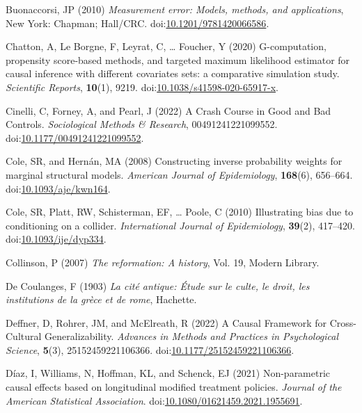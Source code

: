 \documentclass[
  singlecolumn]{article}
\newlength{\cslhangindent}
\newlength{\cslentryspacingunit} %
\newenvironment{CSLReferences}[2] %
 {%
  \setlength{\parindent}{0pt}
  \ifodd #1
  \let\oldpar\par
  \def\par{\hangindent=\cslhangindent\oldpar}
  \fi
  \setlength{\parskip}{#2\cslentryspacingunit}
 }%
 {}
\begin{document}
\begin{CSLReferences}{1}{0}
\leavevmode{}%
Buonaccorsi, JP (2010) \emph{Measurement error: Models, methods, and
applications}, New York: Chapman; Hall/CRC.
doi:\href{https://doi.org/10.1201/9781420066586}{10.1201/9781420066586}.

\leavevmode{}%
Chatton, A, Le Borgne, F, Leyrat, C, \ldots{} Foucher, Y (2020)
G-computation, propensity score-based methods, and targeted maximum
likelihood estimator for causal inference with different covariates
sets: a comparative simulation study. \emph{Scientific Reports},
\textbf{10}(1), 9219.
doi:\href{https://doi.org/10.1038/s41598-020-65917-x}{10.1038/s41598-020-65917-x}.

\leavevmode{}%
Cinelli, C, Forney, A, and Pearl, J (2022) A Crash Course in Good and
Bad Controls. \emph{Sociological Methods \& Research},
00491241221099552.
doi:\href{https://doi.org/10.1177/00491241221099552}{10.1177/00491241221099552}.

\leavevmode{}%
Cole, SR, and Hernán, MA (2008) Constructing inverse probability weights
for marginal structural models. \emph{American Journal of Epidemiology},
\textbf{168}(6), 656--664.
doi:\href{https://doi.org/10.1093/aje/kwn164}{10.1093/aje/kwn164}.

\leavevmode{}%
Cole, SR, Platt, RW, Schisterman, EF, \ldots{} Poole, C (2010)
Illustrating bias due to conditioning on a collider. \emph{International
Journal of Epidemiology}, \textbf{39}(2), 417--420.
doi:\href{https://doi.org/10.1093/ije/dyp334}{10.1093/ije/dyp334}.

\leavevmode{}%
Collinson, P (2007) \emph{The reformation: A history}, Vol. 19, Modern
Library.

\leavevmode{}%
De Coulanges, F (1903) \emph{La cité antique: Étude sur le culte, le
droit, les institutions de la grèce et de rome}, Hachette.

\leavevmode{}%
Deffner, D, Rohrer, JM, and McElreath, R (2022) A Causal Framework for
Cross-Cultural Generalizability. \emph{Advances in Methods and Practices
in Psychological Science}, \textbf{5}(3), 25152459221106366.
doi:\href{https://doi.org/10.1177/25152459221106366}{10.1177/25152459221106366}.

\leavevmode{}%
Díaz, I, Williams, N, Hoffman, KL, and Schenck, EJ (2021) Non-parametric
causal effects based on longitudinal modified treatment policies.
\emph{Journal of the American Statistical Association}.
doi:\href{https://doi.org/10.1080/01621459.2021.1955691}{10.1080/01621459.2021.1955691}.


\end{CSLReferences}
\end{document}
